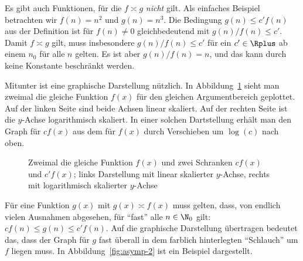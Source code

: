 Es gibt auch Funktionen, für die $f\asymp g$ \emph{nicht} gilt. Als
einfaches Beispiel betrachten wir $f(n)=n^2$ und $g(n)=n^3$. Die
Bedingung $g(n) \leq c'f(n)$ aus der Definition ist für $f(n)\not=0$
gleichbedeutend mit $g(n)/f(n) \leq c'$. Damit $f\asymp g$ gilt, muss
insbesondere $g(n)/f(n) \leq c'$ für ein $c'\in \Rplus$ ab einem $n_0$
für alle $n$ gelten. Es ist aber $g(n)/f(n)=n$, und das kann durch
keine Konstante beschränkt werden.

Mitunter ist eine graphische Darstellung nützlich. In
Abbildung~\ref{fig:asymp-1} sieht man zweimal die gleiche Funktion
$f(x)$ für den gleichen Argumentbereich geplottet. Auf der linken
Seite sind beide Achsen linear skaliert. Auf der rechten Seite ist die
$y$-Achse logarithmisch skaliert. In einer solchen Dartstellung erhält
man den Graph für $cf(x)$ aus dem für $f(x)$ durch Verschieben um
$\log(c)$ nach oben.
%
\begin{figure}[ht]
  \centering
\hspace*{10mm}
  \caption{Zweimal die gleiche Funktion $f(x)$ und zwei Schranken
    $cf(x)$ und $c'f(x)$; links Darstellung mit linear skalierter
    $y$-Achse, rechts mit logarithmisch skalierter $y$-Achse}
  \label{fig:asymp-1}
\end{figure}
%
Für eine Funktion $g(x)$ mit $g(x)\asymp f(x)$ muss gelten, dass, von
endlich vielen Ausnahmen abgesehen, für "`fast"' alle $n\in \N_0$
gilt: $c f(n) \leq g(n) \leq c' f(n)$. Auf die graphische Darstellung
übertragen bedeutet das, dass der Graph für $g$ fast überall in dem
farblich hinterlegten "`Schlauch"' um $f$ liegen muss. In
Abbildung~\ref{fig:asymp-2} ist ein Beispiel dargestellt.

